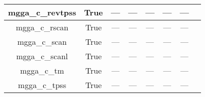 \begin{tabular}{|c|c|c|c|c|c|c|l|}
  mgga\_c\_revtpss &                  True &           --- &           --- &           --- &            --- &        --- &            \cite{Perdew2009_026403,Perdew2009_026403_err} \\ \hline
    mgga\_c\_rscan &                  True &           --- &           --- &           --- &            --- &        --- &                                  \cite{Bartok2019_161101} \\ \hline
     mgga\_c\_scan &                  True &           --- &           --- &           --- &            --- &        --- &                                     \cite{Sun2015_036402} \\ \hline
    mgga\_c\_scanl &                  True &           --- &           --- &           --- &            --- &        --- &   \cite{Mejia2017_052512,Mejia2018_115161,Sun2015_036402} \\ \hline
       mgga\_c\_tm &                  True &           --- &           --- &           --- &            --- &        --- &                                     \cite{Tao2016_073001} \\ \hline
     mgga\_c\_tpss &                  True &           --- &           --- &           --- &            --- &        --- &                     \cite{Tao2003_146401,Perdew2004_6898} \\ \hline
\end{tabular}